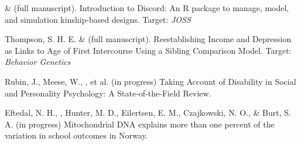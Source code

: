 \item \jt \& \meb (full manuscript). Introduction to Discord: An R package to manage, model, and simulation kinship-based designs. Target: \textit{JOSS}


\item Thompson, S. H. E. \noteA \& \meb (full manuscript). Reestablishing Income and Depression as Links to Age of First Intercourse Using a Sibling Comparison Model. Target: \textit{Behavior Genetics}

\item Rubin, J., Meese, W., \meb, et al. (in progress) Taking Account of Disability in Social and Personality Psychology: A State-of-the-Field Review.

\item Eftedal, N. H., \meb, Hunter, M. D., Eilertsen, E. M., Czajkowski, N. O., \& Burt, S. A. (in progress) Mitochondrial DNA explains more than one percent of the variation in school outcomes in Norway. 




%
%









